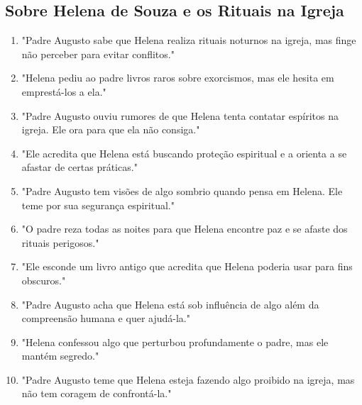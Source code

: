 \subsection*{Sobre Helena de Souza e os Rituais na Igreja}
\begin{enumerate}
    \item "Padre Augusto sabe que Helena realiza rituais noturnos na igreja, mas finge não perceber para evitar conflitos."
    \item "Helena pediu ao padre livros raros sobre exorcismos, mas ele hesita em emprestá-los a ela."
    \item "Padre Augusto ouviu rumores de que Helena tenta contatar espíritos na igreja. Ele ora para que ela não consiga."
    \item "Ele acredita que Helena está buscando proteção espiritual e a orienta a se afastar de certas práticas."
    \item "Padre Augusto tem visões de algo sombrio quando pensa em Helena. Ele teme por sua segurança espiritual."
    \item "O padre reza todas as noites para que Helena encontre paz e se afaste dos rituais perigosos."
    \item "Ele esconde um livro antigo que acredita que Helena poderia usar para fins obscuros."
    \item "Padre Augusto acha que Helena está sob influência de algo além da compreensão humana e quer ajudá-la."
    \item "Helena confessou algo que perturbou profundamente o padre, mas ele mantém segredo."
    \item "Padre Augusto teme que Helena esteja fazendo algo proibido na igreja, mas não tem coragem de confrontá-la."
\end{enumerate}

